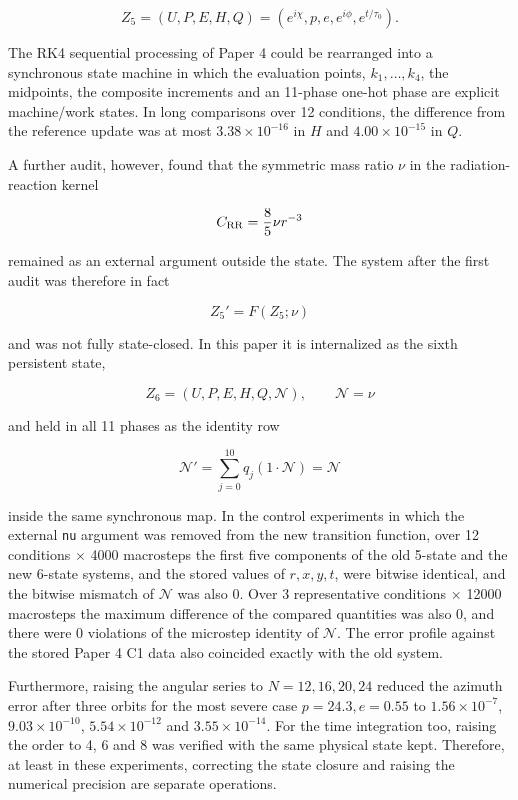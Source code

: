 \documentclass[
  a4paper,
]{article}
\begin{document}
\[
Z_5=(U,P,E,H,Q)
=(e^{i\chi},p,e,e^{i\phi},e^{t/\tau_0}).
\]

The RK4 sequential processing of Paper 4 could be rearranged into a
synchronous state machine in which the evaluation points,
\(k_1,\ldots,k_4\), the midpoints, the composite increments and an
11-phase one-hot phase are explicit machine/work states. In long
comparisons over 12 conditions, the difference from the reference update
was at most \(3.38\times10^{-16}\) in \(H\) and \(4.00\times10^{-15}\)
in \(Q\).

A further audit, however, found that the symmetric mass ratio \(\nu\) in
the radiation-reaction kernel

\[
C_{\rm RR}=\frac85\nu r^{-3}
\]

remained as an external argument outside the state. The system after the
first audit was therefore in fact

\[
Z_5'=F(Z_5;\nu)
\]

and was not fully state-closed. In this paper it is internalized as the
sixth persistent state,

\[
\boxed{
Z_6=(U,P,E,H,Q,\mathcal N),\qquad \mathcal N=\nu
}
\]

and held in all 11 phases as the identity row

\[
\mathcal N'=
\sum_{j=0}^{10}q_j(1\cdot\mathcal N)
=\mathcal N
\]

inside the same synchronous map. In the control experiments in which the
external \texttt{nu} argument was removed from the new transition
function, over 12 conditions \(\times\) 4000 macrosteps the first five
components of the old 5-state and the new 6-state systems, and the
stored values of \(r,x,y,t\), were bitwise identical, and the bitwise
mismatch of \(\mathcal N\) was also 0. Over 3 representative conditions
\(\times\) 12000 macrosteps the maximum difference of the compared
quantities was also 0, and there were 0 violations of the microstep
identity of \(\mathcal N\). The error profile against the stored Paper 4
C1 data also coincided exactly with the old system.

Furthermore, raising the angular series to \(N=12,16,20,24\) reduced the
azimuth error after three orbits for the most severe case
\(p=24.3,e=0.55\) to \(1.56\times10^{-7}\), \(9.03\times10^{-10}\),
\(5.54\times10^{-12}\) and \(3.55\times10^{-14}\). For the time
integration too, raising the order to 4, 6 and 8 was verified with the
same physical state kept. Therefore, at least in these experiments,
correcting the state closure and raising the numerical precision are
separate operations.
\end{document}

